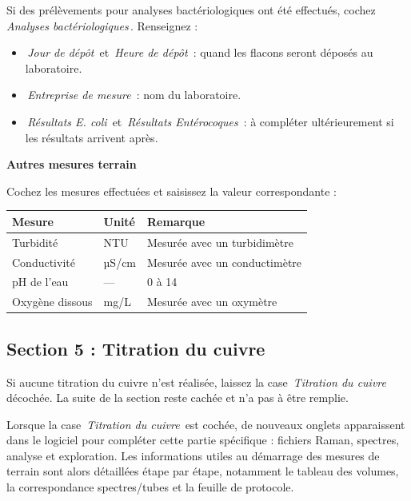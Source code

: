 \documentclass[12pt, a4paper]{article}
\newcommand{\numcercle}[1]{%
  \tikz[baseline=(n.base)]{%
    \node[circle, fill=mainblue, text=white,
          inner sep=2.5pt, font=\bfseries\small] (n) {#1};}%
}
\newcommand{\etape}[2]{%
  \vspace{10pt}%
  \noindent\numcercle{#1}\enskip
  {\large\bfseries\color{mainblue}#2}\par
  \vspace{3pt}%
  \noindent{\color{rulecolor}\rule{\linewidth}{0.4pt}}\par
  \vspace{4pt}%
}
\newcommand{\champ}[1]{\textit{\color{accentteal}\og\,#1\,\fg{}}}
\begin{document}
Si des prélèvements pour analyses bactériologiques ont été effectués,
cochez \champ{Analyses bactériologiques}. Renseignez :
\begin{itemize}
  \item \champ{Jour de dépôt} et \champ{Heure de dépôt} : quand les
        flacons seront déposés au laboratoire.
  \item \champ{Entreprise de mesure} : nom du laboratoire.
  \item \champ{Résultats E. coli} et \champ{Résultats Entérocoques} :
        à compléter ultérieurement si les résultats arrivent après.
\end{itemize}

\etape{11}{Autres mesures terrain}

Cochez les mesures effectuées et saisissez la valeur correspondante :

\begin{center}
\begin{tabularx}{0.9\linewidth}{L{4.2cm} L{2.2cm} L{5.5cm}}
  \toprule
  \textbf{Mesure} & \textbf{Unité} & \textbf{Remarque} \\
  \midrule
  Turbidité & NTU & Mesurée avec un turbidimètre \\
  Conductivité & µS/cm & Mesurée avec un conductimètre \\
  pH de l'eau & --- & 0 à 14 \\
  Oxygène dissous & mg/L & Mesurée avec un oxymètre \\
  \bottomrule
\end{tabularx}
\end{center}

\subsection{Section 5 : Titration du cuivre}

Si aucune titration du cuivre n'est réalisée, laissez la case
\champ{Titration du cuivre} décochée. La suite de la section reste
cachée et n'a pas à être remplie.

\begin{conseil}
  Lorsque la case \champ{Titration du cuivre} est cochée, de nouveaux
  onglets apparaissent dans le logiciel pour compléter cette partie
  spécifique : fichiers Raman, spectres, analyse et exploration. Les
  informations utiles au démarrage des mesures de terrain sont alors
  détaillées étape par étape, notamment le tableau des volumes, la
  correspondance spectres/tubes et la feuille de protocole.
\end{conseil}
\end{document}
